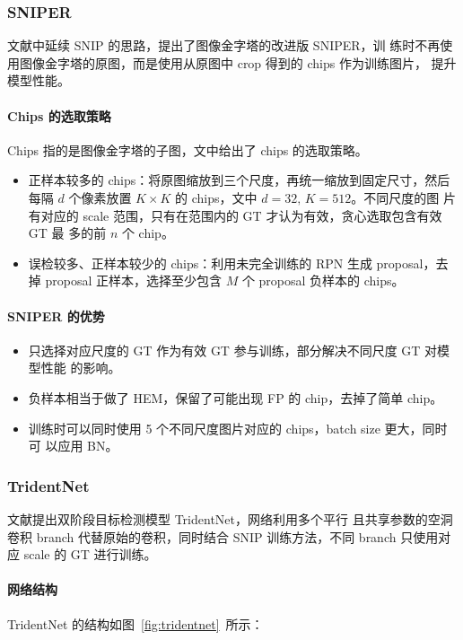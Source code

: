 \subsubsection{SNIPER}
文献中延续 SNIP 的思路，提出了图像金字塔的改进版 SNIPER，训
练时不再使用图像金字塔的原图，而是使用从原图中 crop 得到的 chips 作为训练图片，
提升模型性能。

\paragraph{Chips 的选取策略}
Chips 指的是图像金字塔的子图，文中给出了 chips 的选取策略。

\begin{itemize}
  \item 正样本较多的 chips：将原图缩放到三个尺度，再统一缩放到固定尺寸，然后每隔
    $d$ 个像素放置 $K \times K$ 的 chips，文中 $d = 32,\,K = 512$。不同尺度的图
    片有对应的 scale 范围，只有在范围内的 GT 才认为有效，贪心选取包含有效 GT 最
    多的前 $n$ 个 chip。
  \item 误检较多、正样本较少的 chips：利用未完全训练的 RPN 生成 proposal，去掉
    proposal 正样本，选择至少包含 $M$ 个 proposal 负样本的 chips。
\end{itemize}

\paragraph{SNIPER 的优势}
\begin{itemize}
  \item 只选择对应尺度的 GT 作为有效 GT 参与训练，部分解决不同尺度 GT 对模型性能
    的影响。 
  \item 负样本相当于做了 HEM，保留了可能出现 FP 的 chip，去掉了简单 chip。
  \item 训练时可以同时使用 5 个不同尺度图片对应的 chips，batch size 更大，同时可
    以应用 BN。
\end{itemize}

\subsubsection{TridentNet}
文献提出双阶段目标检测模型 TridentNet，网络利用多个平行
且共享参数的空洞卷积 branch 代替原始的卷积，同时结合 SNIP 训练方法，不同 branch
只使用对应 scale 的 GT 进行训练。 

\paragraph{网络结构}
TridentNet 的结构如图~\ref{fig:tridentnet}~所示：


